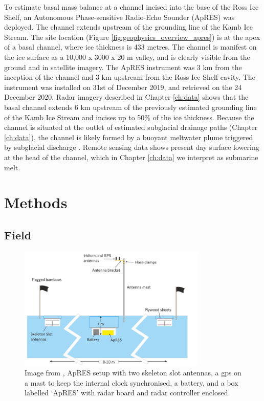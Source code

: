 To estimate basal mass balance at a channel incised into the base of the Ross Ice Shelf, an Autonomous Phase-sensitive Radio-Echo Sounder (ApRES) was deployed. The channel extends upstream of the grounding line of the Kamb Ice Stream. 
The site location (Figure \ref{fig:geophysics_overview_apres}) is at the apex of a basal channel, where ice thickness is 433 metres. 
The channel is manifest on the ice surface as a 10,000 x 3000 x 20 m valley, and is clearly visible from the ground and in satellite imagery. 
The ApRES instrument was 3 km from the inception of the channel and 3 km upstream from the Ross Ice Shelf cavity. The instrument was installed on 31st of December 2019, and retrieved on the 24 December 2020. 
Radar imagery described in Chapter \ref{ch:data} shows that the basal channel extends 6 km upstream of the previously estimated grounding line of the Kamb Ice Stream and incises up to 50\% of the ice thickness.  Because the channel is situated at the outlet of estimated subglacial drainage paths (Chapter \ref{ch:data}), the channel is likely formed by a buoyant meltwater plume triggered by subglacial discharge \citep{kim2016active}. 
Remote sensing data shows present day surface lowering at the head of the channel, which in Chapter \ref{ch:data} we interpret as submarine melt. 


\section{Methods} \label{sec:method}

\subsection{Field}
\begin{figure}[!ht]
\centering
\includegraphics[width=0.8\textwidth]{chapters/3/apres_setup.png}
\caption[]{Image from \cite{nicholls2018apres}, ApRES setup with two skeleton slot antennas, a gps on a mast to keep the internal clock synchronised, a battery, and a box labelled `ApRES' with radar board and radar controller enclosed.}
\label{fig:apres_setup}
\end{figure}

